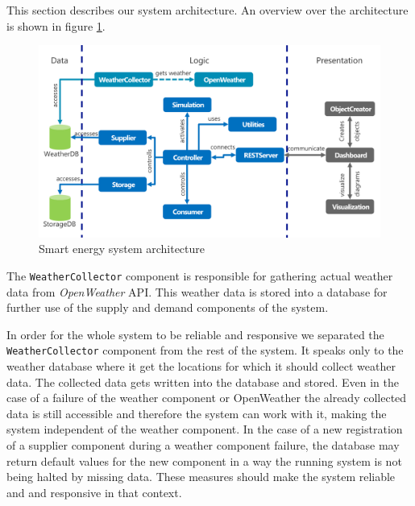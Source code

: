 This section describes our system architecture.
An overview over the architecture is shown in figure \ref{fig:architecture}.
\begin{figure}[!h]
	\centering
		\includegraphics[width=1.00\textwidth]{../figures/Architecture.pdf}
	\caption{Smart energy system architecture}
	\label{fig:architecture}
\end{figure}

The \texttt{WeatherCollector} component is responsible for gathering actual weather data from \textit{OpenWeather} API.
This weather data is stored into a database for further use of the supply and demand components of the system.

In order for the whole system to be reliable and responsive we separated the \texttt{WeatherCollector} component from the rest of the system.
It speaks only to the weather database where it get the locations for which it should collect weather data.
The collected data gets written into the database and stored.
Even in the case of a failure of the weather component or OpenWeather the already collected data is still accessible and therefore the system can work with it, making the system independent of the weather component.
In the case of a new registration of a supplier component during a weather component failure, the database may return default values for the new component in a way the running system is not being halted by missing data.
These measures should make the system reliable and and responsive in that context.

